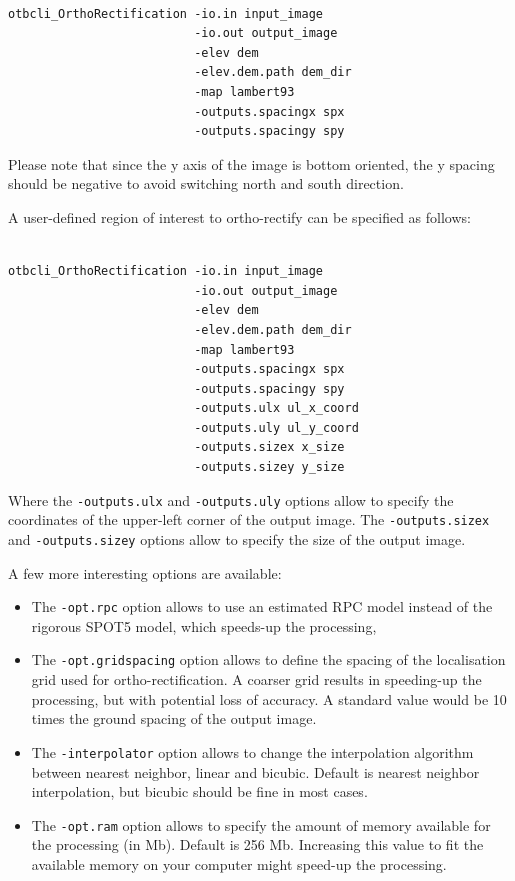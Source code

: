 \begin{verbatim}

otbcli_OrthoRectification -io.in input_image 
                          -io.out output_image 
                          -elev dem
                          -elev.dem.path dem_dir 
                          -map lambert93 
                          -outputs.spacingx spx 
                          -outputs.spacingy spy

\end{verbatim}

Please note that since the y axis of the image is bottom oriented, the
y spacing should be negative to avoid switching north and south direction.

A user-defined region of interest to ortho-rectify can be specified as
follows:

\begin{verbatim}

otbcli_OrthoRectification -io.in input_image 
                          -io.out output_image 
                          -elev dem 
                          -elev.dem.path dem_dir 
                          -map lambert93 
                          -outputs.spacingx spx 
                          -outputs.spacingy spy 
                          -outputs.ulx ul_x_coord 
                          -outputs.uly ul_y_coord 
                          -outputs.sizex x_size 
                          -outputs.sizey y_size

\end{verbatim}

Where the \verb?-outputs.ulx? and \verb?-outputs.uly? options allow to 
specify the coordinates of the upper-left corner of the output image.
The \verb?-outputs.sizex? and \verb?-outputs.sizey? options allow to 
specify the size of the output image.

A few more interesting options are available:
\begin{itemize}
\item The \verb?-opt.rpc? option allows to use an estimated RPC model
  instead of the rigorous SPOT5 model, which speeds-up the processing,
\item The \verb?-opt.gridspacing? option allows to define the spacing of the
  localisation grid used for ortho-rectification. A coarser grid
  results in speeding-up the processing, but with potential loss of
  accuracy. A standard value would be 10 times the ground spacing of 
  the output image.
\item The \verb?-interpolator? option allows to change the interpolation
  algorithm between nearest neighbor, linear and bicubic. Default is nearest 
  neighbor interpolation, but bicubic should be fine in most cases.
\item The \verb?-opt.ram? option allows to specify the amount of memory
  available for the processing (in Mb). Default is 256 Mb. Increasing
  this value to fit the available memory on your computer might
  speed-up the processing.
\end{itemize}



